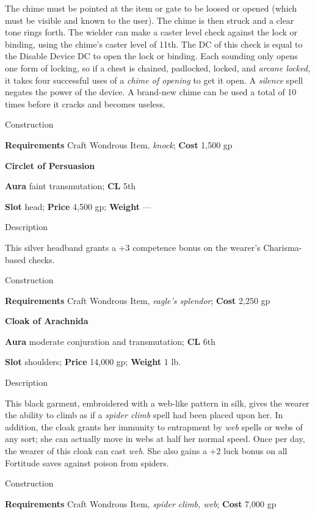 The chime must be pointed at the item or gate to be loosed or opened (which must be visible and known to the user). The chime is then struck and a clear tone rings forth. The wielder can make a caster level check against the lock or binding, using the chime's caster level of 11th. The DC of this check is equal to the Disable Device DC to open the lock or binding. Each sounding only opens one form of locking, so if a chest is chained, padlocked, locked, and \textit{arcane locked, }it takes four successful uses of a \textit{chime of opening }to get it open. A \textit{silence }spell negates the power of the device. A brand-new chime can be used a total of 10 times before it cracks and becomes useless. 
				
Construction
				
\textbf{Requirements} Craft Wondrous Item, \textit{knock}; \textbf{Cost }1,500 gp
				
\textbf{Circlet of Persuasion}
				
\textbf{Aura} faint transmutation;\textbf{ CL }5th
				
\textbf{Slot} head; \textbf{Price} 4,500 gp; \textbf{Weight }---
				
Description
				
This silver headband grants a +3 competence bonus on the wearer's Charisma-based checks. 
				
Construction
				
\textbf{Requirements} Craft Wondrous Item, \textit{eagle's splendor}; \textbf{Cost }2,250 gp
				
\textbf{Cloak of Arachnida}
				
\textbf{Aura} moderate conjuration and transmutation;\textbf{ CL }6th
				
\textbf{Slot} shoulders; \textbf{Price} 14,000 gp; \textbf{Weight} 1 lb.
				
Description
				
This black garment, embroidered with a web-like pattern in silk, gives the wearer the ability to climb as if a \textit{spider climb }spell had been placed upon her. In addition, the cloak grants her immunity to entrapment by \textit{web }spells or webs of any sort; she can actually move in webs at half her normal speed. Once per day, the wearer of this cloak can cast \textit{web}. She also gains a +2 luck bonus on all Fortitude saves against poison from spiders. 
				
Construction
				
\textbf{Requirements} Craft Wondrous Item, \textit{spider climb, web}; \textbf{Cost }7,000 gp
				
